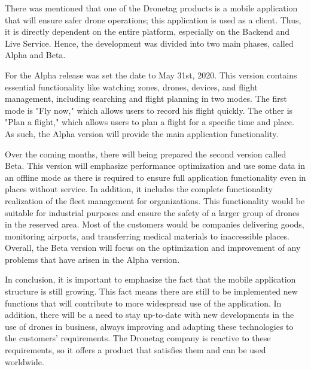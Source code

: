 There was mentioned that one of the Dronetag products is a mobile application that will ensure safer drone operations;
this application is used as a client.
Thus, it is directly dependent on the entire platform, especially on the Backend and Live Service.
Hence, the development was divided into two main phases, called Alpha and Beta.

For the Alpha release was set the date to May 31st, 2020.
This version contains essential functionality like watching zones, drones, devices, and flight management, including searching and flight planning in two modes.
The first mode is "Fly now," which allows users to record his flight quickly.
The other is "Plan a flight," which allows users to plan a flight for a specific time and place.
As such, the Alpha version will provide the main application functionality.

Over the coming months, there will being prepared the second version called Beta.
This version will emphasize performance optimization and use some data in an offline mode as there is required to ensure full application functionality even in places without service.
In addition, it includes the complete functionality realization of the fleet management for organizations.
This functionality would be suitable for industrial purposes and ensure the safety of a larger group of drones in the reserved area.
Most of the customers would be companies delivering goods, monitoring airports, and transferring medical materials to inaccessible places.
Overall, the Beta version will focus on the optimization and improvement of any problems that have arisen in the Alpha version.

In conclusion, it is important to emphasize the fact that the mobile application structure is still growing.
This fact means there are still to be implemented new functions that will contribute to more widespread use of the application.
In addition, there will be a need to stay up-to-date with new developments in the use of drones in business, always improving and adapting these technologies to the customers' requirements.
The Dronetag company is reactive to these requirements, so it offers a product that satisfies them and can be used worldwide.
